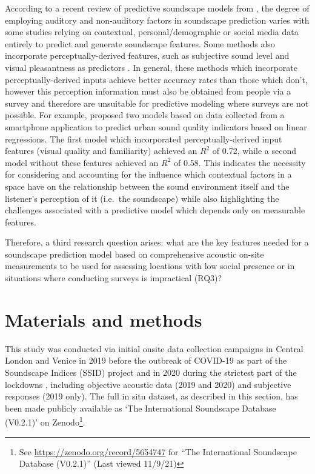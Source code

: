 \documentclass[
  authoryear,
  preprint,
  3p,
  onecolumn]{elsarticle}
\begin{document}
According to a recent review of predictive soundscape models from
\citet{Lionello2020systematic}, the degree of employing auditory and
non-auditory factors in soundscape prediction varies with some studies
relying on contextual, personal/demographic
\citep{Erfanian2021Psychological, Tarlao2020Investigating} or social
media \citep{Aiello2016Chatty} data entirely to predict and generate
soundscape features. Some methods also incorporate perceptually-derived
features, such as subjective sound level and visual pleasantness as
predictors \citep{Lionello2020systematic}. In general, these methods
which incorporate perceptually-derived inputs achieve better accuracy
rates than those which don't, however this perception information must
also be obtained from people via a survey and therefore are unsuitable
for predictive modeling where surveys are not possible. For example,
\citet{Ricciardi2015Sound} proposed two models based on data collected
from a smartphone application to predict urban sound quality indicators
based on linear regressions. The first model which incorporated
perceptually-derived input features (visual quality and familiarity)
achieved an \(R^2\) of 0.72, while a second model without these features
achieved an \(R^2\) of 0.58. This indicates the necessity for
considering and accounting for the influence which contextual factors in
a space have on the relationship between the sound environment itself
and the listener's perception of it (i.e.~the soundscape) while also
highlighting the challenges associated with a predictive model which
depends only on measurable features.

Therefore, a third research question arises: what are the key features
needed for a soundscape prediction model based on comprehensive acoustic
on-site measurements to be used for assessing locations with low social
presence or in situations where conducting surveys is impractical (RQ3)?

\hypertarget{materials-and-methods}{%
\section{Materials and methods}\label{materials-and-methods}}

This study was conducted via initial onsite data collection campaigns in
Central London and Venice in 2019 before the outbreak of COVID-19 as
part of the Soundscape Indices (SSID) project
\citep{Mitchell2020Soundscape} and in 2020 during the strictest part of
the lockdowns \citep{Aletta2020Assessing}, including objective acoustic
data (2019 and 2020) and subjective responses (2019 only). The full in
situ dataset, as described in this section, has been made publicly
available as `The International Soundscape Database (V0.2.1)' on
Zenodo\footnote{See \url{https://zenodo.org/record/5654747} for ``The
  International Soundscape Database (V0.2.1)'' (Last viewed 11/9/21)}\citep{Mitchell2021International}.
\end{document}
